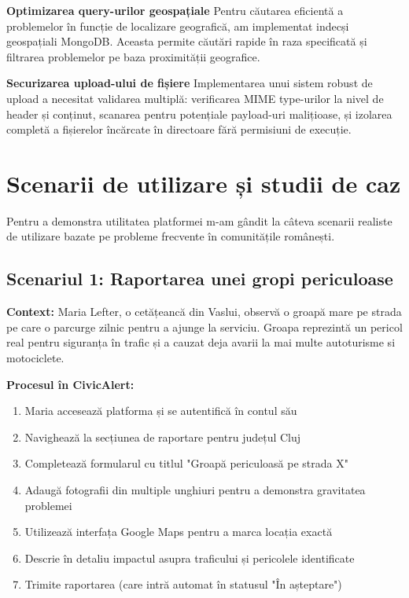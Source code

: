 \documentclass[12pt,a4paper]{report}
\begin{document}
\textbf{Optimizarea query-urilor geospațiale}
Pentru căutarea eficientă a problemelor în funcție de localizare geografică, am implementat indecși geospațiali MongoDB. Aceasta permite căutări rapide în raza specificată și filtrarea problemelor pe baza proximității geografice.

\textbf{Securizarea upload-ului de fișiere}
Implementarea unui sistem robust de upload a necesitat validarea multiplă: verificarea MIME type-urilor la nivel de header și conținut, scanarea pentru potențiale payload-uri malițioase, și izolarea completă a fișierelor încărcate în directoare fără permisiuni de execuție.

\section{Scenarii de utilizare și studii de caz}

Pentru a demonstra  utilitatea platformei m-am gândit la câteva scenarii realiste de utilizare bazate pe probleme frecvente în comunitățile românești.

\subsection{Scenariul 1: Raportarea unei gropi periculoase}

\textbf{Context:} Maria Lefter, o cetățeancă din Vaslui, observă o groapă mare pe strada pe care o parcurge zilnic pentru a ajunge la serviciu. Groapa reprezintă un pericol real pentru siguranța în trafic și a cauzat deja avarii la mai multe autoturisme si motociclete.

\textbf{Procesul în CivicAlert:}
\begin{enumerate}
\item Maria accesează platforma și se autentifică în contul său
\item Navighează la secțiunea de raportare pentru județul Cluj
\item Completează formularul cu titlul "Groapă periculoasă pe strada X"
\item Adaugă fotografii din multiple unghiuri pentru a demonstra gravitatea problemei
\item Utilizează interfața Google Maps pentru a marca locația exactă
\item Descrie în detaliu impactul asupra traficului și pericolele identificate
\item Trimite raportarea (care intră automat în statusul "În așteptare")
\end{enumerate}
\end{document}
